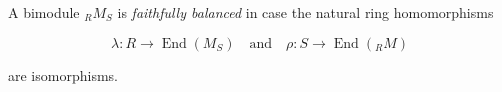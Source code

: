A bimodule $_R M_S$ is \textit{faithfully balanced} in case the natural ring homomorphisms

$$\lambda: R \rightarrow \operatorname{End}(M_S) \quad \text{and} \quad \rho: S \rightarrow \operatorname{End}(_R M)$$

are isomorphisms.
